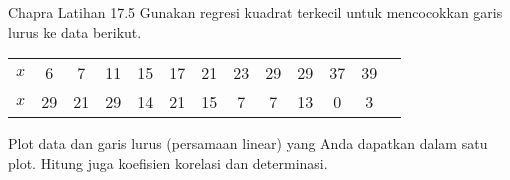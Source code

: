 \begin{soal}{Chapra Latihan 17.5}
Gunakan regresi kuadrat terkecil untuk mencocokkan garis lurus
ke data berikut.

{\centering
\begin{tabular}{|c|cccccccccccc|}
\hline
$x$ & 6 & 7 & 11 & 15 & 17 & 21 & 23 & 29 & 29 & 37 & 39 \\
$x$ & 29 & 21 & 29 & 14 & 21 & 15 & 7 & 7 & 13 & 0 & 3 \\
\hline
\end{tabular}
\par}

Plot data dan garis lurus (persamaan linear) yang Anda dapatkan
dalam satu plot. Hitung juga koefisien korelasi dan determinasi.
\end{soal}


